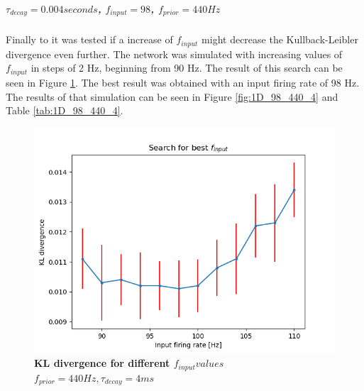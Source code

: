 \subparagraph{$\tau_{decay} = 0.004 seconds$, $f_{input} = 98$, $f_{prior} = 440 Hz$}
Finally to it was tested if a increase of $f_{input}$ might decrease the Kullback-Leibler divergence even further. The network was simulated with increasing values of $f_{input}$ in steps of 2 Hz, beginning from 90 Hz. The result of this search can be seen in Figure \ref{fig:1D_KLD_fPrior440_tau4}. The best result was obtained with an input firing rate of 98 Hz. The results of that simulation can be seen in Figure \ref{fig:1D_98_440_4} and Table \ref{tab:1D_98_440_4}.

\begin{figure}
  \includegraphics[width=\linewidth]{figures/1D/KLDvsfInput_fPrior440tau4.png}
  \caption{\textbf{KL divergence for different $f_{input} values$} $f_{prior} = 440 Hz, \tau_{decay} = 4 ms$}
  \label{fig:1D_KLD_fPrior440_tau4}
\end{figure}

